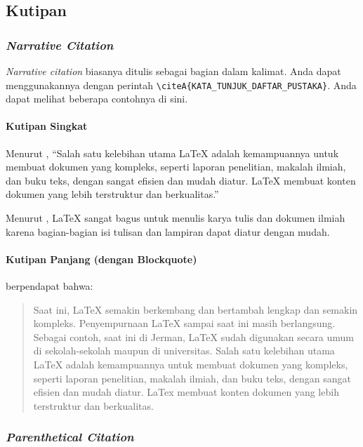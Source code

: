\subsection{Kutipan} \label{subsec:kutipan}

\subsubsection{\textit{Narrative Citation}}

\textit{Narrative citation} biasanya ditulis sebagai bagian dalam kalimat. Anda dapat menggunakannya dengan perintah \verb|\citeA{KATA_TUNJUK_DAFTAR_PUSTAKA}|. Anda dapat melihat beberapa contohnya di sini.

\paragraph{Kutipan Singkat}

Menurut , ``Salah satu kelebihan utama LaTeX adalah kemampuannya untuk membuat dokumen yang kompleks, seperti laporan penelitian, makalah ilmiah, dan buku teks, dengan sangat efisien dan mudah diatur. LaTeX membuat konten dokumen yang lebih terstruktur dan berkualitas.''

Menurut , LaTeX sangat bagus untuk menulis karya tulis dan dokumen ilmiah karena bagian-bagian isi tulisan dan lampiran dapat diatur dengan mudah.

\paragraph{Kutipan Panjang (dengan Blockquote)}

 berpendapat bahwa:

\begin{quote}
    Saat ini, LaTeX semakin berkembang dan bertambah lengkap dan semakin kompleks. Penyempurnaan LaTeX sampai saat ini masih berlangsung. Sebagai contoh, saat ini di Jerman, LaTeX sudah digunakan secara umum di sekolah-sekolah maupun di universitas. Salah satu kelebihan utama LaTeX adalah kemampuannya untuk membuat dokumen yang kompleks, seperti laporan penelitian, makalah ilmiah, dan buku teks, dengan sangat efisien dan mudah diatur. LaTex membuat konten dokumen yang lebih terstruktur dan berkualitas.
\end{quote}

\subsubsection{\textit{Parenthetical Citation}}

